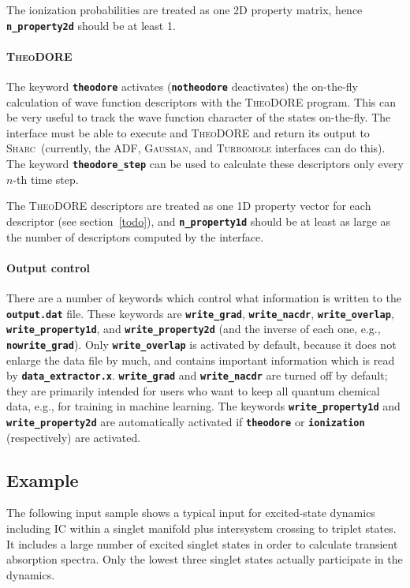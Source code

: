 \documentclass[a4paper,10pt,DIV=15,openany,twoside=false]{scrbook}
\newcommand{\sharc}{\textsc{Sharc}}
\newcommand{\ttt}[1]{\textbf{\texttt{#1}}}
\begin{document}
The ionization probabilities are treated as one 2D property matrix, hence \ttt{n\_property2d} should be at least 1.

\paragraph{\textsc{TheoDORE}}

The keyword \ttt{theodore} activates (\ttt{notheodore} deactivates) the on-the-fly calculation of wave function descriptors with the \textsc{TheoDORE} program. This can be very useful to track the wave function character of the states on-the-fly.
The interface must be able to execute and \textsc{TheoDORE} and return its output to \sharc\ (currently, the ADF, \textsc{Gaussian}, and \textsc{Turbomole} interfaces can do this). The keyword \ttt{theodore\_step} can be used to calculate these descriptors only every $n$-th time step. 

The \textsc{TheoDORE} descriptors are treated as one 1D property vector for each descriptor (see section~\ref{todo}), and \ttt{n\_property1d} should be at least as large as the number of descriptors computed by the interface.

\paragraph{Output control}

There are a number of keywords which control what information is written to the \ttt{output.dat} file.
These keywords are \ttt{write\_grad}, \ttt{write\_nacdr}, \ttt{write\_overlap}, \ttt{write\_property1d}, and \ttt{write\_property2d} (and the inverse of each one, e.g., \ttt{nowrite\_grad}).
Only \ttt{write\_overlap} is activated by default, because it does not enlarge the data file by much, and contains important information which is read by \ttt{data\_extractor.x}.
\ttt{write\_grad} and \ttt{write\_nacdr} are turned off by default; they are primarily intended for users who want to keep all quantum chemical data, e.g., for training in machine learning.
The keywords \ttt{write\_property1d} and \ttt{write\_property2d} are automatically activated if \ttt{theodore} or \ttt{ionization} (respectively) are activated.




\subsection{Example}

The following input sample shows a typical input for excited-state dynamics including IC within a singlet manifold plus intersystem crossing to triplet states. It includes a large number of excited singlet states in order to calculate transient absorption spectra. Only the lowest three singlet states actually participate in the dynamics. 
\end{document}
